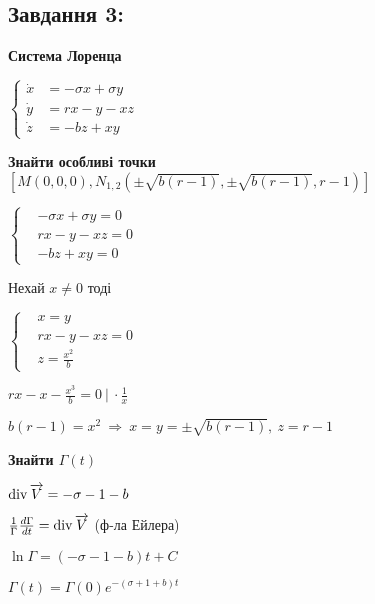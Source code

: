\subsection{Завдання 3:}
\textbf{Система Лоренца}

$\left\{\begin{aligned}
    \dot{x} &= -\sigma x + \sigma y \\
    \dot{y} &= rx - y - xz\\
    \dot{z} &= -bz + xy
\end{aligned}\right.$

\textbf{Знайти особливі точки $[M(0,0,0), N_{1,2}(\pm\sqrt{b(r-1)},\pm\sqrt{b(r-1)}, r-1 )]$} 

$\left\{\begin{aligned}
    &-\sigma x + \sigma y  = 0\\
    &rx - y - xz = 0\\
    &-bz + xy = 0
\end{aligned}\right.$

Нехай $x\neq 0$ тоді

$\left\{\begin{aligned}
    &x = y\\
    &rx - y - xz = 0\\ 
    &z = \frac{x^2}{b}
\end{aligned}\right.$

$rx - x - \frac{x^3}{b} = 0 \ | \ \cdot \frac{1}{x}$

$b(r - 1) = x^2 \ \Longrightarrow \ x = y = \pm \sqrt{b(r-1)}, \ z = r- 1$

\textbf{Знайти $\Gamma(t)$}

$\operatorname*{div} \overrightarrow{V} = -\sigma  - 1 -b$

$\frac{1}{\Gamma} \frac{d\Gamma}{dt} = \operatorname*{div} \overrightarrow{V}$ (ф-ла Ейлера)

$\ln \Gamma = (-\sigma - 1 - b)t + C$

$\Gamma(t) = \Gamma(0) e^{-(\sigma + 1 + b)t}$